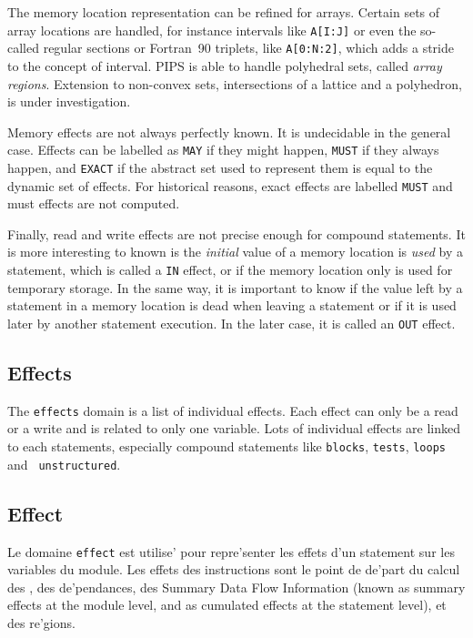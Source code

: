 The memory location representation can be refined for arrays. Certain
sets of array locations are handled, for instance intervals like
\verb/A[I:J]/ or even the so-called regular sections or Fortran~90
triplets, like \verb/A[0:N:2]/, which adds a stride to the concept of
interval. PIPS is able to handle polyhedral sets, called {\em array
regions}. Extension to non-convex sets, intersections of a lattice and a
polyhedron, is under investigation.

Memory effects are not always perfectly known. It is undecidable in the
general case. Effects can be labelled as {\tt MAY} if they might happen,
{\tt MUST} if they always happen, and {\tt EXACT} if the abstract set
used to represent them is equal to the dynamic set of effects. For
historical reasons, exact effects are labelled {\tt MUST} and must
effects are not computed.

Finally, read and write effects are not precise enough for compound
statements. It is more interesting to known is the {\em initial} value
of a memory location is {\em used} by a statement, which is called a
{\tt IN} effect, or if the memory location only is used for temporary
storage. In the same way, it is important to know if the value left by a
statement in a memory location is dead when leaving a statement or if it
is used later by another statement execution. In the later case, it is
called an {\tt OUT} effect.

\subsection{Effects}
\label{subsection-effects}

The {\tt effects} domain is a list of individual effects. Each effect
can only be a read or a write and is related to only one variable. Lots
of individual effects are linked to each statements, especially compound
statements like {\tt blocks}, {\tt tests}, {\tt loops} and {\tt
unstructured}.

{}

\subsection{Effect}
\label{subsection-effect}

{}

Le domaine \verb/effect/ est utilise' pour repre'senter les effets d'un
statement sur les variables du module. Les effets des instructions sont
le point de de'part du calcul des  , des
de'pendances, des Summary Data Flow Information (known as summary
effects at the module level, and as cumulated effects at the statement
level), et des re'gions.

